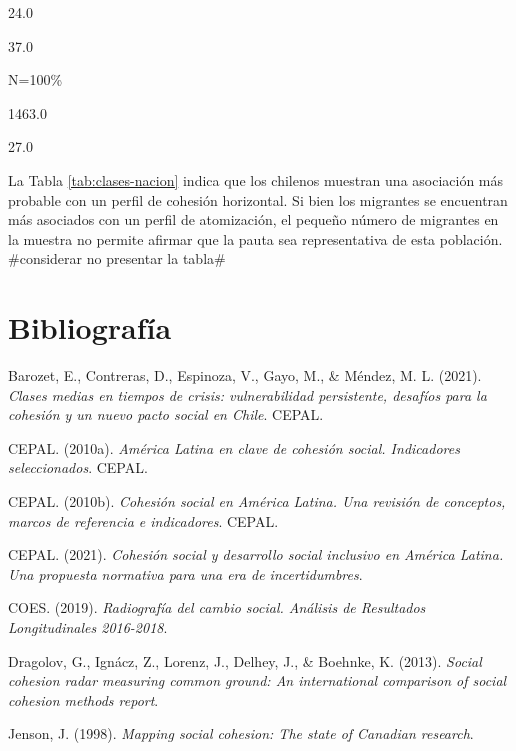 \documentclass[
  12pt,
]{book}
\begin{document}
24.0

37.0

N=100\%

1463.0

27.0

La Tabla \ref{tab:clases-nacion} indica que los chilenos muestran una asociación más probable con un perfil de cohesión horizontal. Si bien los migrantes se encuentran más asociados con un perfil de atomización, el pequeño número de migrantes en la muestra no permite afirmar que la pauta sea representativa de esta población. \#considerar no presentar la tabla\#

\hypertarget{bibliografuxeda}{%
\chapter*{Bibliografía}\label{bibliografuxeda}}

\hypertarget{refs}{}
\leavevmode\hypertarget{ref-barozet_clases_2021}{}%
Barozet, E., Contreras, D., Espinoza, V., Gayo, M., \& Méndez, M. L. (2021). \emph{Clases medias en tiempos de crisis: vulnerabilidad persistente, desafíos para la cohesión y un nuevo pacto social en Chile}. CEPAL.

\leavevmode\hypertarget{ref-cepal_america_2010}{}%
CEPAL. (2010a). \emph{América Latina en clave de cohesión social. Indicadores seleccionados}. CEPAL.

\leavevmode\hypertarget{ref-cepal_cohesion_2010}{}%
CEPAL. (2010b). \emph{Cohesión social en América Latina. Una revisión de conceptos, marcos de referencia e indicadores}. CEPAL.

\leavevmode\hypertarget{ref-cepal_cohesion_2021}{}%
CEPAL. (2021). \emph{Cohesión social y desarrollo social inclusivo en América Latina. Una propuesta normativa para una era de incertidumbres}.

\leavevmode\hypertarget{ref-coes_radiografia_2019}{}%
COES. (2019). \emph{Radiografía del cambio social. Análisis de Resultados Longitudinales 2016-2018}.

\leavevmode\hypertarget{ref-dragolov_social_2013}{}%
Dragolov, G., Ignácz, Z., Lorenz, J., Delhey, J., \& Boehnke, K. (2013). \emph{Social cohesion radar measuring common ground: An international comparison of social cohesion methods report}.

\leavevmode\hypertarget{ref-jenson_mapping_1998}{}%
Jenson, J. (1998). \emph{Mapping social cohesion: The state of Canadian research}.
\end{document}
